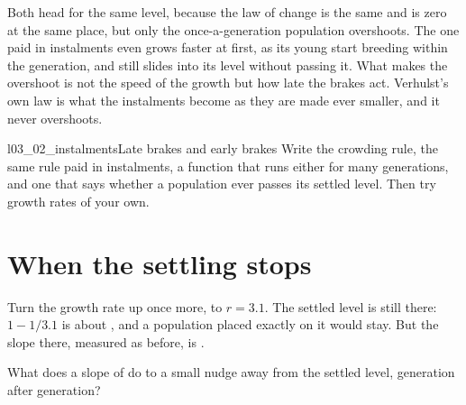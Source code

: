 


\noindent
Both head for the same level, because the law of change is the same and is
zero at the same place, but only the once-a-generation population
overshoots. The one paid in instalments even grows faster at first, as its
young start breeding within the generation, and still slides into its level
without passing it. What makes the overshoot is not the speed of the growth
but how late the brakes act. Verhulst's own law is what the instalments
become as they are made ever smaller, and it never overshoots.


\begin{lab}{l03_02_instalments}{Late brakes and early brakes}
Write the crowding rule, the same rule paid in  instalments, a
function that runs either for many generations, and one that says whether a
population ever passes its settled level. Then try growth rates of your
own.
\end{lab}

\section{When the settling stops}
\label{sec:ch03-cycle}

\noindent
Turn the growth rate up once more, to $r = \num{3.1}$. The settled level is
still there: $1 - 1/\num{3.1}$ is about , and a
population placed exactly on it would stay. But the slope there, measured as
before, is .

\begin{think}
What does a slope of  do to a small nudge away from the
settled level, generation after generation?
\end{think}

